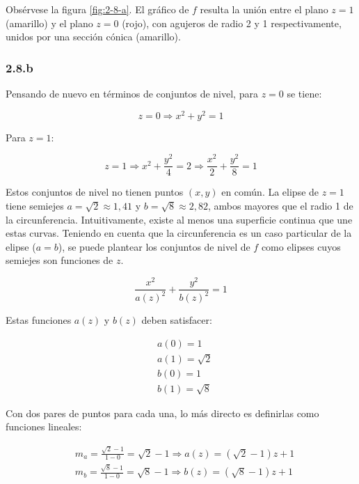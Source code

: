 \documentclass{article}
\begin{document}
Obsérvese la figura \ref{fig:2-8-a}. El gráfico de $f$ resulta la unión entre el plano $z=1$ (amarillo) y el plano $z=0$ (rojo), con agujeros de radio 2 y 1 respectivamente, unidos por una sección cónica (amarillo).

\subsubsection*{2.8.b}
\label{subsubsec:2.8.b}

Pensando de nuevo en términos de conjuntos de nivel, para $z = 0$ se tiene:

\begin{equation}
z = 0 \Rightarrow x^2 + y^2 = 1
\end{equation}

Para $z = 1$:

\begin{equation}
z = 1 \Rightarrow x^2 + \frac{y^2}{4} = 2 \Rightarrow \frac{x^2}{2} + \frac{y^2}{8} = 1
\end{equation}

Estos conjuntos de nivel no tienen puntos $(x,y)$ en común. La elipse de $z=1$ tiene semiejes $a = \sqrt{2} \approx 1,41$ y $b = \sqrt{8} \approx 2,82$, ambos mayores que el radio 1 de la circunferencia. Intuitivamente, existe al menos una superficie continua que une estas curvas. Teniendo en cuenta que la circunferencia es un caso particular de la elipse ($a=b$), se puede plantear los conjuntos de nivel de $f$ como elipses cuyos semiejes son funciones de $z$. 

\begin{equation}
\frac{x^2}{a(z)^2} + \frac{y^2}{b(z)^2} = 1
\end{equation}

Estas funciones $a(z)$ y $b(z)$ deben satisfacer:

\begin{subequations}
\begin{align}
& a(0) = 1 \\
& a(1) = \sqrt{2} \\
& b(0) = 1 \\
& b(1) = \sqrt{8}
\end{align}
\end{subequations}

Con dos pares de puntos para cada una, lo más directo es definirlas como funciones lineales:

\begin{subequations}
\begin{align}
& m_a = \frac{\sqrt{2}-1}{1-0} = \sqrt{2} - 1 \Rightarrow a(z) = (\sqrt{2}-1) z + 1 \\
& m_b = \frac{\sqrt{8}-1}{1-0} = \sqrt{8} - 1 \Rightarrow b(z) = (\sqrt{8}-1) z + 1
\end{align}
\end{subequations}
\end{document}
